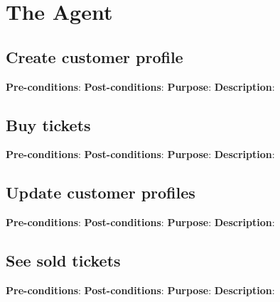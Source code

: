 \section{The Agent}

%
%

\subsection{Create customer profile}
\textbf{Pre-conditions}:
\textbf{Post-conditions}:
\textbf{Purpose}:
\textbf{Description}:

\subsection{Buy tickets}
\textbf{Pre-conditions}:
\textbf{Post-conditions}:
\textbf{Purpose}:
\textbf{Description}:

\subsection{Update customer profiles}
\textbf{Pre-conditions}:
\textbf{Post-conditions}:
\textbf{Purpose}:
\textbf{Description}:

\subsection{See sold tickets}
\textbf{Pre-conditions}:
\textbf{Post-conditions}:
\textbf{Purpose}:
\textbf{Description}:
